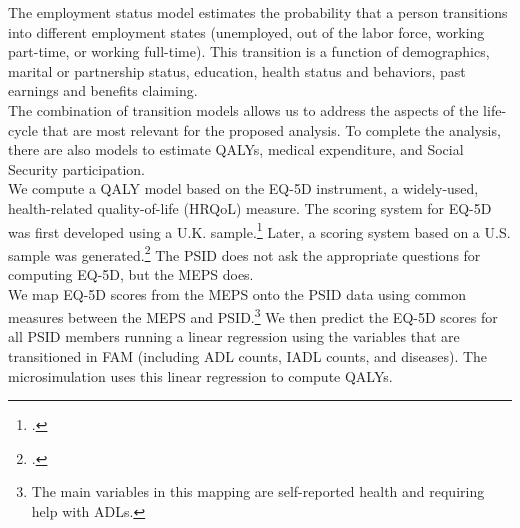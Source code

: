 \noindent The employment status model estimates the probability that a person transitions into different employment states (unemployed, out of the labor force, working part-time, or working full-time).  This transition is a function of demographics, marital or partnership status, education, health status and behaviors, past earnings and benefits claiming. \\



\noindent The combination of transition models allows us to address the aspects of the life-cycle that are most relevant for the proposed analysis. To complete the analysis, there are also models to estimate QALYs, medical expenditure, and Social Security participation. \\

\noindent We compute a QALY model based on the EQ-5D instrument, a widely-used, health-related
quality-of-life (HRQoL) measure. %
The scoring system for EQ-5D was first developed using a U.K. sample.\footnote{\citet{Dolan_1997_Modeling_MC}.} Later, a scoring system based on
a U.S. sample was generated.\footnote{\citet{Shaw_etal_2005_EQ5D_MC}.} The PSID does not ask the appropriate questions for computing EQ-5D, but the MEPS does. \\

\noindent We map EQ-5D scores from the MEPS onto the PSID data using common measures between the MEPS and PSID.\footnote{The main variables in this mapping are self-reported health and requiring help with ADLs.} We then predict the EQ-5D scores for all PSID members running a linear regression using the variables that are transitioned in FAM (including ADL counts, IADL counts, and diseases). The microsimulation uses this linear regression to compute QALYs. \\
%


